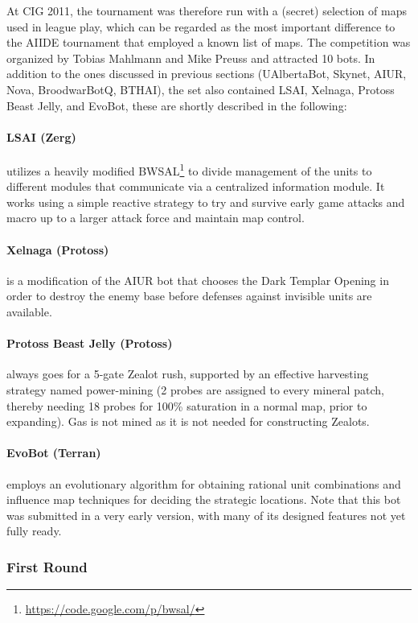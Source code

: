 \documentclass[journal]{IEEEtran}
\begin{document}
At CIG 2011, the tournament was therefore run with a (secret) selection
of maps used in league play, which can be regarded as the most important
difference to the AIIDE tournament that employed a known list of maps.
The competition was organized by Tobias Mahlmann and Mike
Preuss and attracted 10 bots. In addition to the ones discussed in previous
sections (UAlbertaBot, Skynet, AIUR, Nova, BroodwarBotQ, BTHAI), 
the set also contained LSAI, Xelnaga, Protoss Beast Jelly, and EvoBot,
these are shortly described in the following:

\paragraph*{LSAI (Zerg)} utilizes a heavily modified BWSAL\footnote{\url{https://code.google.com/p/bwsal/}} to divide management
 of the units to different modules that communicate via a centralized information
 module. It works using a simple reactive strategy to try and survive early game
 attacks and macro up to a larger attack force and maintain map control.
 
\paragraph*{Xelnaga (Protoss)} is a modification of the AIUR bot that chooses the 
Dark Templar Opening in order to destroy the enemy base before defenses against
invisible units are available. 

\paragraph*{Protoss Beast Jelly (Protoss)}
always goes for a 5-gate Zealot rush, supported by an effective harvesting 
strategy named power-mining (2 probes are assigned to every mineral patch,
thereby needing 18 probes for 100\% saturation in a normal map, prior
to expanding). Gas is not mined as it is not needed for constructing Zealots.

\paragraph*{EvoBot (Terran)} employs an evolutionary algorithm for obtaining rational
 unit combinations and influence map techniques for deciding the strategic locations. Note
 that this bot was submitted in a very early version, with many of its designed features not
 yet fully ready. 

\subsubsection{First Round}
\label{sec:cig-first-round}
\end{document}
